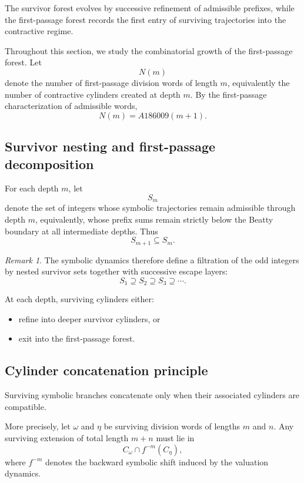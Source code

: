 \documentclass[12pt, oneside]{article}
\numberwithin{equation}{section}
\theoremstyle{definition}
\theoremstyle{plain}
\theoremstyle{remark}
\newtheorem*{remark}{Remark}
\begin{document}
The survivor forest evolves by successive refinement of admissible
prefixes, while the first-passage forest records the first entry of
surviving trajectories into the contractive regime.

Throughout this section, we study the combinatorial growth of the
first-passage forest.  Let
\[
N(m)
\]
denote the number of first-passage division words of length \(m\),
equivalently the number of contractive cylinders created at depth
\(m\). By the first-passage characterization of admissible words,
\[
N(m)=A186009(m+1).
\]

\subsection{Survivor nesting and first-passage decomposition}

For each depth \(m\), let
\[
S_m
\]
denote the set of integers whose symbolic trajectories remain
admissible through depth \(m\), equivalently, whose prefix sums
remain strictly below the Beatty boundary at all intermediate depths.
Thus
\[
S_{m+1}\subseteq S_m.
\]

\begin{remark}
The symbolic dynamics therefore define a filtration of the odd
integers by nested survivor sets together with successive escape
layers:
\[
S_1 \supseteq S_2 \supseteq S_3 \supseteq \cdots.
\]

At each depth, surviving cylinders either:
\begin{itemize}
\item refine into deeper survivor cylinders, or
\item exit into the first-passage forest.
\end{itemize}
\end{remark}

\subsection{Cylinder concatenation principle}

Surviving symbolic branches concatenate only when their associated
cylinders are compatible.

More precisely, let \(\omega\) and \(\eta\) be surviving division
words of lengths \(m\) and \(n\). Any surviving extension of total
length \(m+n\) must lie in
\[
C_\omega \cap f^{-m}(C_\eta),
\]
where \(f^{-m}\) denotes the backward symbolic shift induced by the
valuation dynamics.
\end{document}
